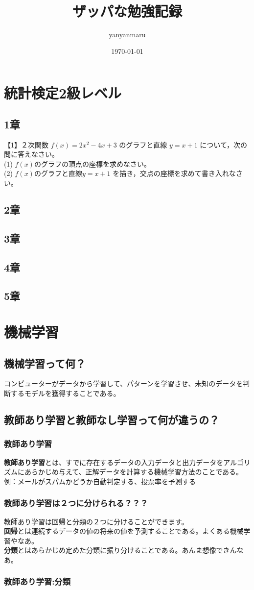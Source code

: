 \documentclass{article}
\title{ザッパな勉強記録}
\author{yanyanmaru}
\date{\today}
\begin{document}
\maketitle
\section{統計検定2級レベル}
\subsection{1章}
【1】２次関数 $f(x)=2x^2-4x+3$ のグラフと直線 $y=x+1$ について，次の問に答えなさい。\\
(1) $f(x)$のグラフの頂点の座標を求めなさい。\\
(2) $f(x)$のグラフと直線$y=x+1$ を描き，交点の座標を求めて書き入れなさい。\\

\subsection{2章}
\subsection{3章}
\subsection{4章}
\subsection{5章}

\section{機械学習}
\subsection{機械学習って何？}
コンピューターがデータから学習して、パターンを学習させ、未知のデータを判断するモデルを獲得することである。

\subsection{教師あり学習と教師なし学習って何が違うの？}
\subsubsection{教師あり学習}
\textbf{教師あり学習}とは、すでに存在するデータの入力データと出力データをアルゴリズムにあらかじめ与えて、正解データを計算する機械学習方法のことである。 \\
例：メールがスパムかどうか自動判定する、投票率を予測する

\subsubsection{教師あり学習は２つに分けられる？？？}
教師あり学習は回帰と分類の２つに分けることができます。\\
\textbf{回帰}とは連続するデータの値の将来の値を予測することである。よくある機械学習やなあ。\\
\textbf{分類}とはあらかじめ定めた分類に振り分けることである。あんま想像できんなあ。

\subsubsection{教師あり学習:分類}
\end{document}
